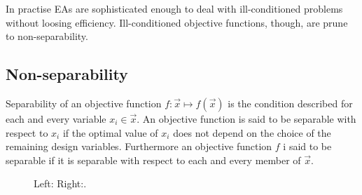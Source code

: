 In practise EAs are sophisticated enough to deal with ill-conditioned problems without loosing efficiency. Ill-conditioned objective functions, though, are prune to non-separability.         


\subsection{Non-separability}    
Separability of an objective function $f:\vec{x}\mapsto f(\vec{x})$ is the condition described for each and every variable $x_i \in \vec{x}$. An objective function is said to be separable with respect to $x_i$ if the optimal value of $x_i$ does not depend on the choice of the remaining design variables. Furthermore an objective function $f$ i said to be separable if it is separable with respect to each and every member of $\vec{x}$.


\begin{figure}[h!]
\begin{minipage}[b]{0.5\linewidth}
 \centering
\end{minipage}
\begin{minipage}[b]{0.5\linewidth}
 \centering
\end{minipage}
\caption{Left:  Right:.} 
\label{nonsep}
\end{figure}

